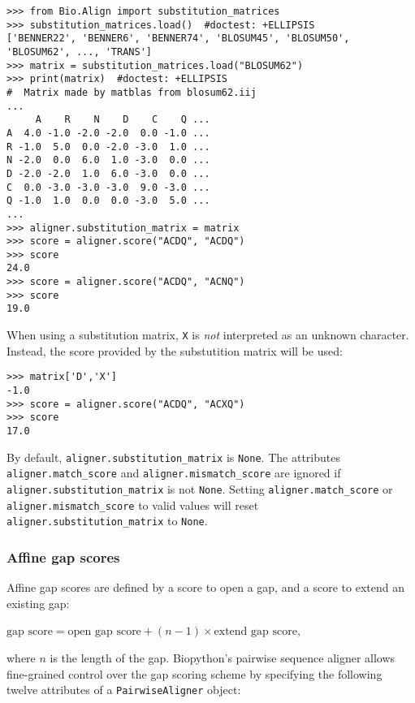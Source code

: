 \begin{itemize}
\begin{verbatim}
>>> from Bio.Align import substitution_matrices
>>> substitution_matrices.load()  #doctest: +ELLIPSIS
['BENNER22', 'BENNER6', 'BENNER74', 'BLOSUM45', 'BLOSUM50', 'BLOSUM62', ..., 'TRANS']
>>> matrix = substitution_matrices.load("BLOSUM62")
>>> print(matrix)  #doctest: +ELLIPSIS
#  Matrix made by matblas from blosum62.iij
...
     A    R    N    D    C    Q ...
A  4.0 -1.0 -2.0 -2.0  0.0 -1.0 ...
R -1.0  5.0  0.0 -2.0 -3.0  1.0 ...
N -2.0  0.0  6.0  1.0 -3.0  0.0 ...
D -2.0 -2.0  1.0  6.0 -3.0  0.0 ...
C  0.0 -3.0 -3.0 -3.0  9.0 -3.0 ...
Q -1.0  1.0  0.0  0.0 -3.0  5.0 ...
...
>>> aligner.substitution_matrix = matrix
>>> score = aligner.score("ACDQ", "ACDQ")
>>> score
24.0
>>> score = aligner.score("ACDQ", "ACNQ")
>>> score
19.0
\end{verbatim}
When using a substitution matrix, \verb+X+ is {\em not} interpreted as an unknown character. Instead, the score provided by the substutition matrix will be used:

\begin{verbatim}
>>> matrix['D','X']
-1.0
>>> score = aligner.score("ACDQ", "ACXQ")
>>> score
17.0
\end{verbatim}
\end{itemize}

By default, \verb+aligner.substitution_matrix+ is \verb+None+.
The attributes \verb+aligner.match_score+ and \verb+aligner.mismatch_score+ are
ignored if \verb+aligner.substitution_matrix+ is not \verb+None+.
Setting \verb+aligner.match_score+ or \verb+aligner.mismatch_score+ to valid values will reset \verb+aligner.substitution_matrix+ to \verb+None+.
 
\subsubsection{Affine gap scores}
\label{sec:pairwise-affine-gapscores}

Affine gap scores are defined by a score to open a gap, and a score to extend
an existing gap:

$\textrm{gap score} = \textrm{open gap score} + (n-1) \times \textrm{extend gap score}$,

where $n$ is the length of the gap.
Biopython's pairwise sequence aligner allows fine-grained control over the gap
scoring scheme by specifying the following twelve attributes of a \verb+PairwiseAligner+ object:

